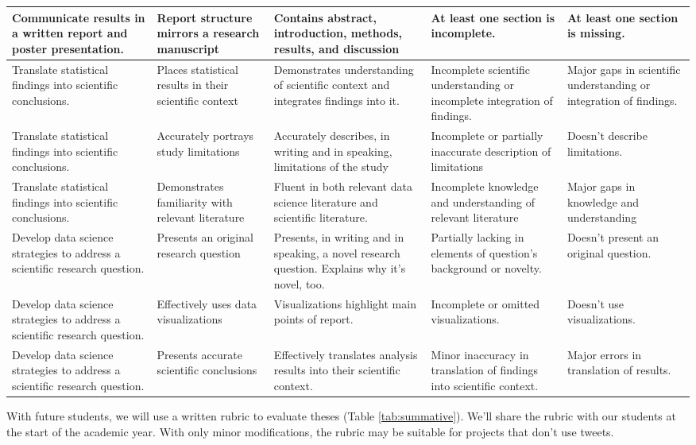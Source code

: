 \documentclass[
]{article}
\begin{document}
\begin{table}
\begin{tabular}[t]{>{\raggedright\arraybackslash}p{10em}|>{\raggedright\arraybackslash}p{10em}|>{\raggedright\arraybackslash}p{10em}|>{\raggedright\arraybackslash}p{10em}|>{\raggedright\arraybackslash}p{10em}}
\hline
Communicate results in a written report and poster presentation. & Report structure mirrors a research manuscript & Contains abstract, introduction, methods, results, and discussion & At least one section is incomplete. & At least one section is missing.\\
\hline
Translate statistical findings into scientific conclusions. & Places statistical results in their scientific context & Demonstrates understanding of scientific context and integrates findings into it. & Incomplete scientific understanding or incomplete integration of findings. & Major gaps in scientific understanding or integration of findings.\\
\hline
Translate statistical findings into scientific conclusions. & Accurately portrays study limitations & Accurately describes, in writing and in speaking, limitations of the study & Incomplete or partially inaccurate description of limitations & Doesn't describe limitations.\\
\hline
Translate statistical findings into scientific conclusions. & Demonstrates familiarity with relevant literature & Fluent in both relevant data science literature and scientific literature. & Incomplete knowledge and understanding of relevant literature & Major gaps in knowledge and understanding\\
\hline
Develop data science strategies to address a scientific research question. & Presents an original research question & Presents, in writing and in speaking, a novel research question. Explains why it's novel, too. & Partially lacking in elements of question's background or novelty. & Doesn't present an original question.\\
\hline
Develop data science strategies to address a scientific research question. & Effectively uses data visualizations & Visualizations highlight main points of report. & Incomplete or omitted visualizations. & Doesn't use visualizations.\\
\hline
Develop data science strategies to address a scientific research question. & Presents accurate scientific conclusions & Effectively translates analysis results into their scientific context. & Minor inaccuracy in translation of findings into scientific context. & Major errors in translation of results.\\
\hline
\end{tabular}
\end{table}

With future students, we will use a written rubric to evaluate
theses (Table \ref{tab:summative}). We'll
share the rubric with our students at the start of the academic year. With only minor
modifications, the rubric may be suitable for projects that don't use tweets.
\end{document}
